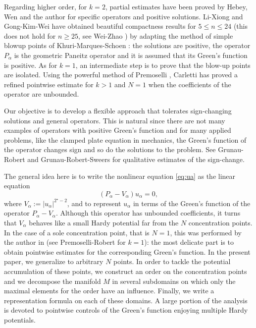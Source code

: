 \documentclass[reqno]{amsart}
\def \crit {2^\star}
\def \ua {u_\alpha}
\begin{document}
\smallskip\noindent Regarding higher order, for $k=2$, partial estimates have been proved by Hebey, Wen and the author \cites{hebey:2003,HRW,HR} for specific operators and positive solutions. Li-Xiong \cite{lx} and Gong-Kim-Wei \cite{gkw}  have obtained beautiful compactness results for $5\leq n\leq 24$ (this does not hold for $n\geq 25$, see Wei-Zhao \cite{wz}) by adapting the method of simple blowup points of Khuri-Marques-Schoen \cite{kms}: the solutions are positive, the operator $P_\alpha$ is the geometric Paneitz operator and it is assumed that its Green's function is positive. As for $k=1$, an intermediate step is to prove that the blow-up points are isolated. Using the powerful method of Premoselli \cite{premoselli}, Carletti \cite{carletti} has proved a refined pointwise estimate for $k>1$ and $N=1$ when the coefficients of the operator are unbounded.

\smallskip\noindent Our objective is to develop a flexible approach that tolerates sign-changing solutions and general operators. This is natural since there are not many examples of operators with positive Green's function and for many applied problems, like the clamped plate equation in mechanics, the Green's function of the operator changes sign and so do the solutions to the problem. See Grunau-Robert \cite{gr:arma} and Grunau-Robert-Sweers \cite{grs} for qualitative estimates of the sign-change.

\smallskip\noindent The general idea here is to write the nonlinear equation \eqref{eq:ua} as the linear equation
\begin{equation}\label{model:linear}
(P_\alpha-V_\alpha)\ua=0,
\end{equation}
where $V_\alpha:=|\ua|^{\crit-2}$, and to represent $\ua$ in terms of the Green's function of the operator $P_\alpha-V_\alpha$. Although this operator has unbounded coefficients, it turns that $V_\alpha$ behaves like a small Hardy potential far from the $N$ concentration points. In the case of a sole concentration point, that is $N=1$, this was performed by the author in \cite{robert:gjms} (see Premoselli-Robert \cite{PR} for $k=1$): the most delicate part is to obtain pointwise estimates for the corresponding Green's function. In the present paper, we generalize \cite{robert:gjms} to arbitrary $N$ points. In order to tackle the potential accumulation of these points, we construct an order on the concentration points and we decompose the manifold $M$ in several subdomains on which only the maximal elements for the order have an influence. Finally, we write a representation formula on each of these domains. A large portion of the analysis is devoted to pointwise controls of the Green's function enjoying multiple Hardy potentials.
\end{document}
